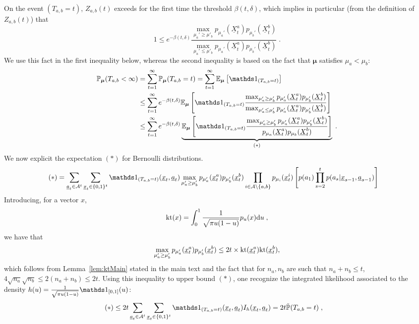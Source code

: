 \documentclass{colt2016} %
\begin{document}
On the event $(T_{a,b}=t)$, $Z_{a,b}(t)$ exceeds for the first time the threshold $\beta(t,\delta)$, which implies in particular (from the definition of $Z_{a,b}(t)$) that  
\[1 \leq e^{-\beta(t,\delta)} \frac{\max_{{\mu}_a' \geq {\mu}'_b} p_{\mu_a'}(\underline{X}^a_t)p_{\mu_b'}(\underline{X}^b_t)}{\max_{{\mu}_a' \leq {\mu}'_b} p_{\mu_a'}(\underline{X}^a_t)p_{\mu_b'}(\underline{X}^b_t)}\;.\]
We use this fact in the first inequality below, whereas the second inequality is based on the fact that $\bm \mu$ satisfies $\mu_a < \mu_b$:
 \begin{align*}
 \bP_{\bm \mu}(T_{a,b}< \infty) & = \sum_{t=1}^\infty \bP_{\bm \mu}(T_{a,b}=t) = \sum_{t=1}^\infty \bE_{\bm \mu}\left[\ind_{(T_{a,b}=t)}\right] \\
 & \leq \sum_{t=1}^\infty e^{-\beta(t,\delta)}\bE_{\bm \mu}\left[\ind_{(T_{a,b}=t)} \frac{\max_{{\mu}_a' \geq {\mu}'_b} p_{\mu_a'}(\underline{X}^a_t)p_{\mu_b'}(\underline{X}^b_t)}{\max_{ {\mu}_a' \leq {\mu}'_b} p_{\mu_a'}(\underline{X}^a_t)p_{\mu_b'}(\underline{X}^b_t)}\right] \\
 & \leq \sum_{t=1}^\infty e^{-\beta(t,\delta)}\underbrace{\bE_{\bm \mu}\left[\ind_{(T_{a,b}=t)} \frac{\max_{{\mu}_a' \geq {\mu}'_b} p_{\mu_a'}(\underline{X}^a_t)p_{\mu_b'}(\underline{X}^b_t)}{p_{\mu_a}(\underline{X}^a_t)p_{\mu_b}(\underline{X}^b_t)}\right]}_{(*)}\;. 
\end{align*}
We now explicit the expectation $(*)$ for Bernoulli distributions. 
\begin{align*}
(*) & = \sum_{\underline{a}_t \in \Arms^t}\sum_{\underline{x}_t \in \{0,1\}^t} \ind_{(T_{a,b}=t)}(\underline{x}_t,\underline{a}_t) \max_{{\mu}_a' \geq {\mu}'_b}p_{\mu_a'}(\underline{x}^a_t)p_{\mu_b'}(\underline{x}^b_t) \prod_{i \in \Arms \setminus \{a,b\}} p_{\mu_i}(\underline{x}_t^i) \left[p(a_1) \prod_{s=2}^t p(a_s | \underline{x}_{s-1},\underline{a}_{s-1})\right]
\end{align*}
Introducing, for a vector $x$, 
\[\mathrm{kt}(x) = \int_0^1 \frac{1}{\sqrt{\pi u(1-u)}} p_u(x) \mathrm{d} u\;,\]
we have that 
\[ \max_{{\mu}_a' \geq {\mu}'_b}p_{\mu_a'}(\underline{x}^a_t)p_{\mu_b'}(\underline{x}^b_t) \leq 2 t \times  \mathrm{kt}(\underline{x}^a_t)\mathrm{kt}(\underline{x}^b_t),\]
which follows from Lemma~\ref{lem:ktMain} stated in the main text and the fact that for $n_a,n_b$ are such that $n_a + n_b \leq t$, $4\sqrt{n_a}\sqrt{n_b}\leq 2(n_a + n_b) \leq 2t$.
Using this inequality to upper bound $(*)$, one recognize the integrated likelihood associated to the density $h(u)=\frac{1}{\sqrt{\pi u (1-u)}}\ind_{[0,1]}(u)$:
 \begin{align*}
(*)  & \leq 2t \sum_{\underline{a}_t \in \Arms^t}\sum_{\underline{x}_t \in \{0,1\}^t} \ind_{(T_{a,b}=t)}(\underline{x}_t,\underline{a}_t) I_{h}(\underline{x}_t,\underline{a}_t) =  2t \tilde{\bP}(T_{a,b}=t)\;, 
\end{align*}
\end{document}
